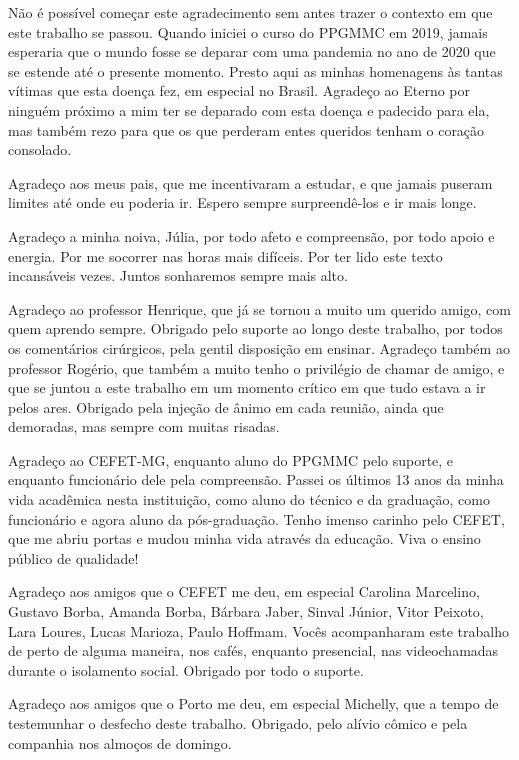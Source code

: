 \begin{agradecimentos}
Não é possível começar este agradecimento sem antes trazer o contexto em que este trabalho se passou. Quando iniciei o curso do PPGMMC em 2019, jamais esperaria que o mundo fosse se deparar com uma pandemia no ano de 2020 que se estende até o presente momento. Presto aqui as minhas homenagens às tantas vítimas que esta doença fez, em especial no Brasil. Agradeço ao Eterno por ninguém próximo a mim ter se deparado com esta doença e padecido para ela, mas também rezo para que os que perderam entes queridos tenham o coração consolado.

Agradeço aos meus pais, que me incentivaram a estudar, e que jamais puseram limites até onde eu poderia ir. Espero sempre surpreendê-los e ir mais longe. 

Agradeço a minha noiva, Júlia, por todo afeto e compreensão, por todo apoio e energia. Por me socorrer nas horas mais difíceis. Por ter lido este texto incansáveis vezes. Juntos sonharemos sempre mais alto. 

Agradeço ao professor Henrique, que já se tornou a muito um querido amigo, com quem aprendo sempre. Obrigado pelo suporte ao longo deste trabalho, por todos os comentários cirúrgicos, pela gentil disposição em ensinar. Agradeço também ao professor Rogério, que também a muito tenho o privilégio de chamar de amigo, e que se juntou a este trabalho em um momento crítico em que tudo estava a ir pelos ares. Obrigado pela injeção de ânimo em cada reunião, ainda que demoradas, mas sempre com muitas risadas. 

Agradeço ao CEFET-MG, enquanto aluno do PPGMMC pelo suporte, e enquanto funcionário dele pela compreensão. Passei os últimos 13 anos da minha vida acadêmica nesta instituição, como aluno do técnico e da graduação, como funcionário e agora aluno da pós-graduação. Tenho imenso carinho pelo CEFET, que me abriu portas e mudou minha vida através da educação. Viva o ensino público de qualidade!

Agradeço aos amigos que o CEFET me deu, em especial Carolina Marcelino,  Gustavo Borba, Amanda Borba, Bárbara Jaber, Sinval Júnior, Vitor Peixoto, Lara Loures, Lucas Marioza, Paulo Hoffmam. Vocês acompanharam este trabalho de perto de alguma maneira, nos cafés, enquanto presencial, nas videochamadas durante o isolamento social. Obrigado por todo o suporte. 

Agradeço aos amigos que o Porto me deu, em especial Michelly, que a tempo de testemunhar o desfecho deste trabalho. Obrigado, pelo alívio cômico e pela companhia nos almoços de domingo.

\end{agradecimentos}